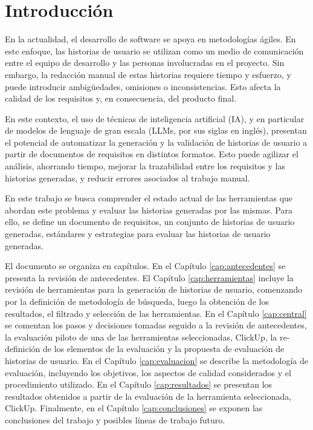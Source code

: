 \chapter{Introducción}

En la actualidad, el desarrollo de software se apoya en metodologías ágiles. En este enfoque, las historias de usuario se utilizan como un medio de comunicación entre el equipo de desarrollo y las personas involucradas en el proyecto. Sin embargo, la redacción manual de estas historias requiere tiempo y esfuerzo, y puede introducir ambigüedades, omisiones o inconsistencias. Esto afecta la calidad de los requisitos y, en consecuencia, del producto final.

En este contexto, el uso de técnicas de inteligencia artificial (IA), y en particular de modelos de lenguaje de gran escala (LLMs, por sus siglas en inglés), presentan el potencial de automatizar la generación y la validación de historias de usuario a partir de documentos de requisitos en distintos formatos. Esto puede agilizar el análisis, ahorrando tiempo, mejorar la trazabilidad entre los requisitos y las historias generadas, y reducir errores asociados al trabajo manual. %

En este trabajo se busca comprender el estado actual de las herramientas que abordan este problema y evaluar las historias generadas por las mismas. Para ello, se define un documento de requisitos, un conjunto de historias de usuario generadas, estándares y estrategias para evaluar las historias de usuario generadas.

El documento se organiza en capítulos. En el Capítulo \ref{cap:antecedentes} se presenta la revisión de antecedentes. El Capítulo \ref{cap:herramientas} incluye la revisión de herramientas para la generación de historias de usuario, comenzando por la definición de metodología de búsqueda, luego la obtención de los resultados, el filtrado y selección de las herramientas. En el Capítulo \ref{cap:central} se comentan los pasos y decisiones tomadas seguido a la revisión de antecedentes, la evaluación piloto de una de las herramientas seleccionadas, ClickUp, la re-definición de los elementos de la evaluación y la propuesta de evaluación de historias de usuario. En el Capítulo \ref{cap:evaluacion} se describe la metodología de evaluación, incluyendo los objetivos, los aspectos de calidad considerados y el procedimiento utilizado. 
En el Capítulo \ref{cap:resultados} se presentan los resultados obtenidos a partir de la evaluación de la herramienta seleccionada, ClickUp. Finalmente, en el Capítulo \ref{cap:conclusiones} se exponen las conclusiones del trabajo y posibles líneas de trabajo futuro.
